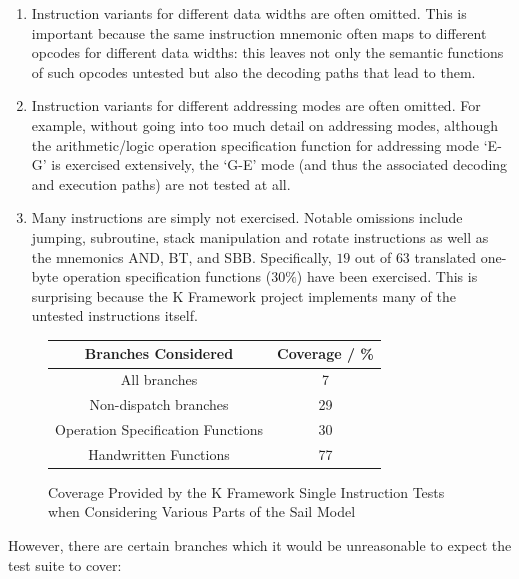 \documentclass[a4paper,12pt,twoside,openright]{report}
\begin{document}
\begin{enumerate}
  \item Instruction variants for different data widths are often omitted.  This is important because the same instruction mnemonic often maps to different opcodes for different data widths: this leaves not only the semantic functions of such opcodes untested but also the decoding paths that lead to them.

  \item Instruction variants for different addressing modes are often omitted.  For example, without going into too much detail on addressing modes, although the arithmetic/logic operation specification function for addressing mode `E-G' is exercised extensively, the `G-E' mode (and thus the associated decoding and execution paths) are not tested at all.

  \item Many instructions are simply not exercised.  Notable omissions include jumping, subroutine, stack manipulation and rotate instructions as well as the mnemonics AND, BT, and SBB.  Specifically, $19$ out of $63$ translated one-byte operation specification functions ($30\%$) have been exercised.  This is surprising because the K Framework project implements many of the untested instructions itself.
\end{enumerate}


\begin{figure}
\caption{Coverage Provided by the K Framework Single Instruction Tests when Considering Various Parts of the Sail Model}
\label{coverage-table}
\begin{center}
\begin{tabular}{|c|c|}
\hline
Branches Considered & Coverage / \% \\
\hline
All branches & 7 \\
Non-dispatch branches & 29 \\
Operation Specification Functions & 30 \\
Handwritten Functions &  77 \\
\hline
\end{tabular}
\end{center}
\end{figure}

However, there are certain branches which it would be unreasonable to expect the test suite to cover:
\end{document}
